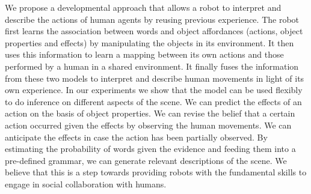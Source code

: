 
We propose a developmental approach that allows a robot to interpret and describe the actions of human agents by reusing previous experience.
The robot first learns the association between words and object affordances (actions, object properties and effects) by manipulating the objects in its environment.
It then uses this information to learn a mapping between its own actions and those performed by a human in a shared environment.
It finally fuses the information from these two models to interpret and describe human movements in light of its own experience.
In our experiments we show that the model can be used flexibly to do inference on different aspects of the scene.
We can predict the effects of an action on the basis of object properties.
We can revise the belief that a certain action occurred given the effects by observing the human movements.
We can anticipate the effects in case the action has been partially observed.
By estimating the probability of words given the evidence and feeding them into a pre-defined grammar, we can generate relevant descriptions of the scene.
We believe that this is a step towards providing robots with the fundamental skills to engage in social collaboration with humans.
